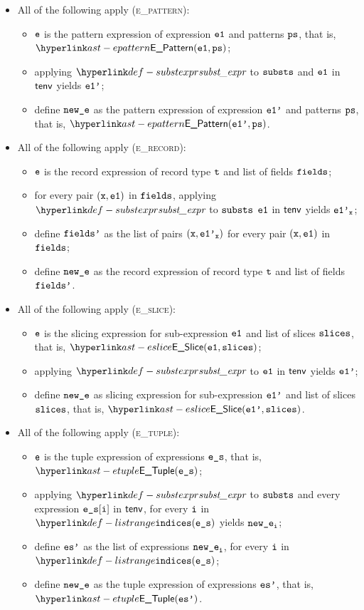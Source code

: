 \begin{itemize}
  \item All of the following apply (\textsc{e\_pattern}):
  \begin{itemize}
    \item $\texttt{e}$ is the pattern expression of expression $\texttt{e1}$ and patterns $\texttt{ps}$, that is, \\
          $\EPattern(\veone, \vps)$;
    \item applying $\substexpr$ to $\texttt{substs}$ and $\texttt{e1}$ in $\textsf{tenv}$ yields $\texttt{e1'}$;
    \item define $\texttt{new\_e}$ as the pattern expression of expression $\texttt{e1'}$ and patterns $\texttt{ps}$, that is, $\EPattern(\veonep, \vps)$.
  \end{itemize}

  \item All of the following apply (\textsc{e\_record}):
  \begin{itemize}
    \item $\texttt{e}$ is the record expression of record type $\texttt{t}$ and list of fields $\texttt{fields}$;
    \item for every pair $(\texttt{x},\texttt{e1})$ in $\texttt{fields}$, applying $\substexpr$ to $\texttt{substs}$ $\texttt{e1}$ in $\textsf{tenv}$ yields $\texttt{e1'}_{\texttt{x}}$;
    \item define $\texttt{fields'}$ as the list of pairs $(\texttt{x},\texttt{e1'}_{\texttt{x}})$ for every pair $(\texttt{x},\texttt{e1})$ in $\texttt{fields}$;
    \item define $\texttt{new\_e}$ as the record expression of record type $\texttt{t}$ and list of fields $\texttt{fields'}$.
  \end{itemize}

  \item All of the following apply (\textsc{e\_slice}):
  \begin{itemize}
    \item $\texttt{e}$ is the slicing expression for sub-expression $\texttt{e1}$ and list of slices $\texttt{slices}$, that is, $\ESlice(\veone, \vslices)$;
    \item applying $\substexpr$ to $\texttt{e1}$ in $\textsf{tenv}$ yields $\texttt{e1'}$;
    \item define $\texttt{new\_e}$ as slicing expression for sub-expression $\texttt{e1'}$ and list of slices $\texttt{slices}$, that is, $\ESlice(\veonep, \vslices)$.
  \end{itemize}

  \item All of the following apply (\textsc{e\_tuple}):
  \begin{itemize}
    \item $\texttt{e}$ is the tuple expression of expressions $\texttt{e\_s}$, that is, $\ETuple(\ves)$;
    \item applying $\substexpr$ to $\texttt{substs}$ and every expression $\texttt{e\_s}[\texttt{i}]$ in $\textsf{tenv}$, for every $\texttt{i}$ in $\listrange(\ves)$
          yields $\texttt{new\_e}_{\texttt{i}}$;
    \item define $\texttt{es'}$ as the list of expressions $\texttt{new\_e}_{\texttt{i}}$, for every $\texttt{i}$ in $\listrange(\ves)$;
    \item define $\texttt{new\_e}$ as the tuple expression of expressions $\texttt{es'}$, that is, $\ETuple(\vesp)$.
  \end{itemize}


\end{itemize}
